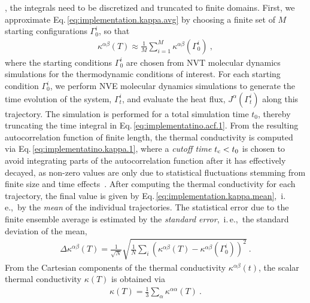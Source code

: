 , the integrals need to be discretized and truncated to finite domains. First, we approximate Eq.\,\eqref{eq:implementation.kappa.avg} by choosing a finite set of $M$ starting configurations $\Gamma_0^i$, so that
\begin{align}
	\kappa^{\alpha \beta} (T)
		\approx
		\frac{1}{M} \sum_{i=1}^M \kappa^{\alpha \beta} (\Gamma_0^i)~,
	\label{eq:implementation.kappa.mean}
\end{align}
where the starting conditions $\Gamma_0^i$ are chosen from NVT molecular dynamics simulations for the thermodynamic conditions of interest. For each starting condition $\Gamma_0^i$, we perform NVE molecular dynamics simulations to generate the time evolution of the system, $\Gamma_t^i$, 
and evaluate the heat flux, $J^\alpha (\Gamma_t^i)$ along this trajectory. The simulation is performed for a total simulation time $t_0$, thereby truncating the time integral in Eq.\,\eqref{eq:implementatino.acf.1}. From the resulting autocorrelation function of finite length, the thermal conductivity is computed via Eq.\,\eqref{eq:implementatino.kappa.1}, where a \emph{cutoff time} $t_{\rm c} < t_0$ is chosen to avoid integrating parts of the autocorrelation function after it has effectively decayed, as non-zero values are only due to statistical fluctuations stemming from finite size and time effects~\cite{Jones.2012}.
After computing the thermal conductivity for each trajectory, the final value is given by Eq.\,\eqref{eq:implementation.kappa.mean},~i.\,e.,~by the \emph{mean} of the individual trajectories. The statistical error due to the finite ensemble average is estimated by the \emph{standard error},~i.\,e.,~the standard deviation of the mean,
\begin{align}
	\Delta \kappa^{\alpha \beta} (T)
		= \frac{1}{\sqrt{N}} \sqrt{\frac{1}{N} \sum_i \left( \kappa^{\alpha \beta} (T) - \kappa^{\alpha \beta} (\Gamma_0^i) \right)^2}~.
	\label{eq:imp.kappa.err}
\end{align}
From the Cartesian components of the thermal conductivity $\kappa^{\alpha \beta} (t)$, the scalar thermal conductivity $\kappa (T)$ is obtained via
\begin{align}
	\kappa (T)
		= \frac{1}{3} \sum_{\alpha} \kappa^{\alpha \alpha} (T)~.
	\label{eq:kappa.scalar}
\end{align}



